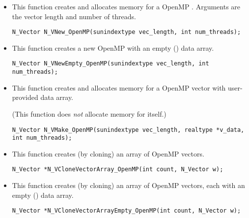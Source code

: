 \begin{itemize}


\item {}

  This function creates and allocates memory for a OpenMP .
  Arguments are the vector length and number of threads.

  \verb|N_Vector N_VNew_OpenMP(sunindextype vec_length, int num_threads);|


\item {}

  This function creates a new OpenMP  with an empty () data array.

  

  \verb|N_Vector N_VNewEmpty_OpenMP(sunindextype vec_length, int num_threads);|


\item {}

 This function creates and allocates memory for a OpenMP vector
 with user-provided data array.

 (This function does {\em not} allocate memory for  itself.)

 \verb|N_Vector N_VMake_OpenMP(sunindextype vec_length, realtype *v_data, int num_threads);|


\item {}

 This function creates (by cloning) an array of  OpenMP vectors.

 

 \verb|N_Vector *N_VCloneVectorArray_OpenMP(int count, N_Vector w);|


\item {}

 This function creates (by cloning) an array of  OpenMP vectors, each with an
 empty () data array.

 

 \verb|N_Vector *N_VCloneVectorArrayEmpty_OpenMP(int count, N_Vector w);|


\end{itemize}
